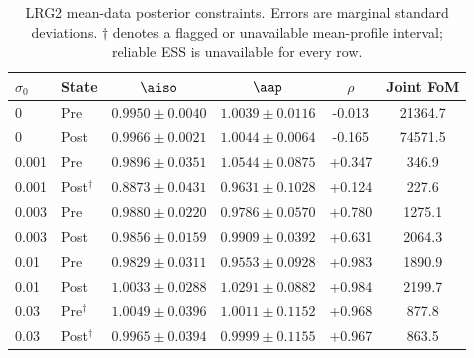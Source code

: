 \begin{table}[t]
\caption{\label{tab:baseline_LRG2}LRG2 mean-data posterior constraints. Errors are marginal standard deviations. $\dagger$ denotes a flagged or unavailable mean-profile interval; reliable ESS is unavailable for every row.}
\begin{ruledtabular}
\begin{tabular}{llcccc}
$\sigma_0$ & State & $\aiso$ & $\aap$ & $\rho$ & Joint FoM \\
\hline
0 & Pre & $0.9950\pm0.0040$ & $1.0039\pm0.0116$ & -0.013 & 21364.7 \\
0 & Post & $0.9966\pm0.0021$ & $1.0044\pm0.0064$ & -0.165 & 74571.5 \\
0.001 & Pre & $0.9896\pm0.0351$ & $1.0544\pm0.0875$ & +0.347 & 346.9 \\
0.001 & Post$^{\dagger}$ & $0.8873\pm0.0431$ & $0.9631\pm0.1028$ & +0.124 & 227.6 \\
0.003 & Pre & $0.9880\pm0.0220$ & $0.9786\pm0.0570$ & +0.780 & 1275.1 \\
0.003 & Post & $0.9856\pm0.0159$ & $0.9909\pm0.0392$ & +0.631 & 2064.3 \\
0.01 & Pre & $0.9829\pm0.0311$ & $0.9553\pm0.0928$ & +0.983 & 1890.9 \\
0.01 & Post & $1.0033\pm0.0288$ & $1.0291\pm0.0882$ & +0.984 & 2199.7 \\
0.03 & Pre$^{\dagger}$ & $1.0049\pm0.0396$ & $1.0011\pm0.1152$ & +0.968 & 877.8 \\
0.03 & Post$^{\dagger}$ & $0.9965\pm0.0394$ & $0.9999\pm0.1155$ & +0.967 & 863.5 \\
\end{tabular}
\end{ruledtabular}
\end{table}
